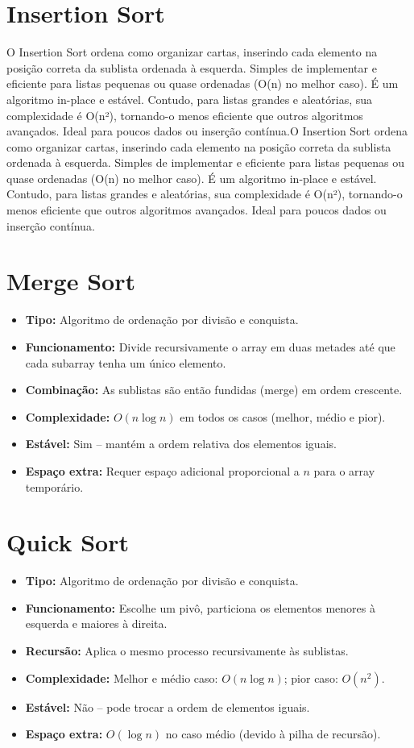 \documentclass[12pt, a4paper]{report}
\begin{document}
\section{Insertion Sort}
O Insertion Sort ordena como organizar cartas, inserindo cada elemento na posição correta da sublista ordenada à esquerda. Simples de implementar e eficiente para listas pequenas ou quase ordenadas (O(n) no melhor caso). É um algoritmo in-place e estável. Contudo, para listas grandes e aleatórias, sua complexidade é O(n²), tornando-o menos eficiente que outros algoritmos avançados. Ideal para poucos dados ou inserção contínua.O Insertion Sort ordena como organizar cartas, inserindo cada elemento na posição correta da sublista ordenada à esquerda. Simples de implementar e eficiente para listas pequenas ou quase ordenadas (O(n) no melhor caso). É um algoritmo in-place e estável. Contudo, para listas grandes e aleatórias, sua complexidade é O(n²), tornando-o menos eficiente que outros algoritmos avançados. Ideal para poucos dados ou inserção contínua.

\section{Merge Sort}
\begin{itemize}
  \item \textbf{Tipo:} Algoritmo de ordenação por divisão e conquista.
  \item \textbf{Funcionamento:} Divide recursivamente o array em duas metades até que cada subarray tenha um único elemento.
  \item \textbf{Combinação:} As sublistas são então fundidas (merge) em ordem crescente.
  \item \textbf{Complexidade:} $O(n \log n)$ em todos os casos (melhor, médio e pior).
  \item \textbf{Estável:} Sim – mantém a ordem relativa dos elementos iguais.
  \item \textbf{Espaço extra:} Requer espaço adicional proporcional a $n$ para o array temporário.
\end{itemize}


\section{Quick Sort}
\begin{itemize}
  \item \textbf{Tipo:} Algoritmo de ordenação por divisão e conquista.
  \item \textbf{Funcionamento:} Escolhe um pivô, particiona os elementos menores à esquerda e maiores à direita.
  \item \textbf{Recursão:} Aplica o mesmo processo recursivamente às sublistas.
  \item \textbf{Complexidade:} Melhor e médio caso: $O(n \log n)$; pior caso: $O(n^2)$.
  \item \textbf{Estável:} Não – pode trocar a ordem de elementos iguais.
  \item \textbf{Espaço extra:} $O(\log n)$ no caso médio (devido à pilha de recursão).
\end{itemize}
\end{document}
